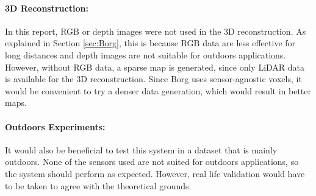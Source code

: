\documentclass[12pt]{article}
\begin{document}
\paragraph{3D Reconstruction: } In this report, RGB or depth images were not used in the 3D reconstruction. As explained in Section \ref{sec:Borg}, this is because RGB data are less effective for long distances and depth images are not suitable for outdoors applications. However, without RGB data, a sparse map is generated, since only LiDAR data is available for the 3D reconstruction. Since Borg uses sensor-agnostic voxels, it would be convenient to try a denser data generation, which would result in better maps.
	
\paragraph{Outdoors Experiments: } It would also be beneficial to test this system in a dataset that is mainly outdoors. None of the sensors used are not suited for outdoors applications, so the system should perform as expected. However, real life validation would have to be taken to agree with the theoretical grounds.


		
	\newpage
	
	
\end{document}
